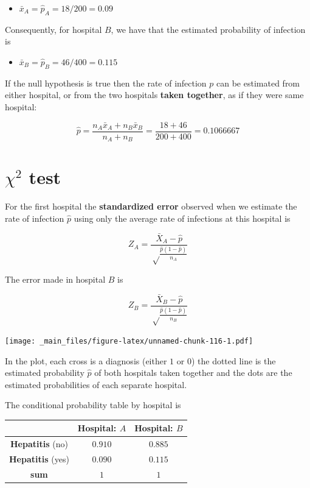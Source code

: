 \documentclass[
]{book}
\providecommand{\tightlist}{%
  \setlength{\itemsep}{0pt}\setlength{\parskip}{0pt}}
\begin{document}
\begin{itemize}
\tightlist
\item
  \(\bar{x}_A=\hat{p}_A=18/200=0.09\)
\end{itemize}

Consequently, for hospital \(B\), we have that the estimated probability of infection is

\begin{itemize}
\tightlist
\item
  \(\bar{x}_B=\hat{p}_B=46/400=0.115\)
\end{itemize}

If the null hypothesis is true then the rate of infection \(p\) can be estimated from either hospital, or from the two hospitals \textbf{taken together}, as if they were same hospital:

\[\hat{p}=\frac{n_A\bar{x}_A+n_B\bar{x}_B}{n_A+n_B}=\frac{18+46}{200+400}=0.1066667\]

\hypertarget{chi2-test}{%
\section{\texorpdfstring{\(\chi^2\) test}{\textbackslash chi\^{}2 test}}\label{chi2-test}}

For the first hospital the \textbf{standardized error} observed when we estimate the rate of infection \(\hat{p}\) using only the average rate of infections at this hospital is

\[Z_A= \frac{\bar{X}_A-\hat{p}}{\sqrt\frac{\hat{p}(1-\hat{p})}{n_A}}\]

The error made in hospital \(B\) is

\[Z_B= \frac{\bar{X}_B-\hat{p}}{\sqrt\frac{\hat{p}(1-\hat{p})}{n_B}}\]

\texttt{[image: \_main\_files/figure-latex/unnamed-chunk-116-1.pdf]}

In the plot, each cross is a diagnosis (either \(1\) or \(0\)) the dotted line is the estimated probability \(\hat{p}\) of both hospitals taken together and the dots are the estimated probabilities of each separate hospital.

The conditional probability table by hospital is

\begin{longtable}[]{@{}ccc@{}}
\toprule
& Hospital: \(A\) & Hospital: \(B\) \\
\midrule
\endhead
\textbf{Hepatitis} (no) & \(0.910\) & \(0.885\) \\
\textbf{Hepatitis} (yes) & \(0.090\) & \(0.115\) \\
\textbf{sum} & \(1\) & \(1\) \\
\bottomrule
\end{longtable}
\end{document}
